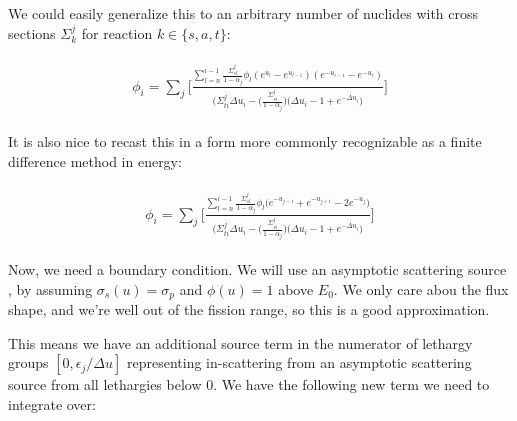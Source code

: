 \documentclass{article}
\begin{document}
        We could easily generalize this to an arbitrary number of nuclides with cross sections $\Sigma_k^j$ for 
        reaction $k \in \{s,a,t\}$:
        
        \begin{align}
        \begin{split}
            \label{eq:soln}
            \phi_i =
                \sum_j \bigg[
            \frac{
                \sum_{l = n}^{i-1} \frac{ \Sigma_{sl}^j }{1-\alpha_j}  \phi_l  (e^{u_l} - e^{u_{l-1}})   (e^{-u_{i-1}} - e^{-u_{i}}) 
            }
            {  
                \bigg(  \Sigma_{ti}^j  \Delta u_i  - 
                \big( \frac{ \Sigma_{si}^j }{1-\alpha_j}  \big)
            \big( \Delta u_i -1 + e^{-\Delta u_i} \big) 
             }
         \bigg]
        \end{split}
        \end{align}
        
        It is also nice to recast this in a form more commonly recognizable as a finite difference method in energy:

        \begin{align}
        \begin{split}
            \label{eq:soln}
            \phi_i =
                \sum_j \bigg[
            \frac{
                \sum_{l = n}^{i-1} \frac{ \Sigma_{sl}^j }{1-\alpha_j}  \phi_l  \big( e^{-u_{j-1}} +  e^{-u_{j+1}} - 2 e^{-u_j} \big)
            }
            { 
                \bigg(  \Sigma_{ti}^j  \Delta u_i  - 
                \big( \frac{ \Sigma_{si}^j }{1-\alpha_j}  \big)
            \big( \Delta u_i -1 + e^{-\Delta u_i} \big) 
             }
         \bigg]
        \end{split}
        \end{align}

        Now, we need a boundary condition. 
        We will use an asymptotic scattering source , by assuming $\sigma_s(u) = \sigma_p$ and 
        $\phi(u) = 1$ above $E_0$. 
        We only care abou the flux shape, and we're well out of the fission range, so this is a good approximation.
        
        This means we have an additional source term in the numerator of 
        lethargy groups $[0,\epsilon_j/\Delta u]$
        representing in-scattering from an asymptotic scattering source from
        all lethargies below 0.
        We have the following new term we need to integrate over:
        
        \begin{align}
        \begin{split}
            \label{eq:balance_group-1}
        \end{split}
        \end{align}
        
\end{document}
